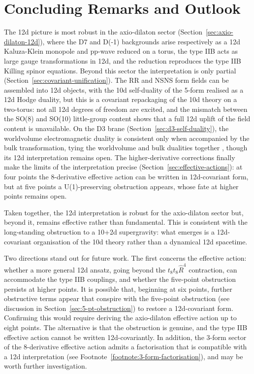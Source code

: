 \section{Concluding Remarks and Outlook}
\label{sec:outlook}

The 12d picture is most robust in the axio-dilaton sector (Section~\ref{sec:axio-dilaton-12d}), where the D7 and D(-1) backgrounds arise respectively as a 12d Kaluza-Klein monopole and pp-wave reduced on a torus, the type IIB \SLZ{} acts as large gauge transformations in 12d, and the reduction reproduces the type IIB Killing spinor equations.
Beyond this sector the interpretation is only partial (Section~\ref{sec:covariant-unification}).
The RR and NSNS form fields can be assembled into 12d objects, with the 10d self-duality of the 5-form realised as a 12d Hodge duality, but this is a covariant repackaging of the 10d theory on a two-torus: not all 12d degrees of freedom are excited, and the mismatch between the SO(8) and SO(10) little-group content shows that a full 12d uplift of the field content is unavailable.
On the D3 brane (Section~\ref{sec:d3-self-duality}), the worldvolume electromagnetic \SLZ{} duality is consistent only when accompanied by the bulk \SLZ{} transformation, tying the worldvolume and bulk dualities together \cite{Tseytlin:1996it}, though its 12d interpretation remains open.
The higher-derivative corrections finally make the limits of the interpretation precise (Section~\ref{sec:effective-actions}): at four points the 8-derivative effective action can be written in 12d-covariant form, but at five points a U(1)-preserving obstruction appears, whose fate at higher points remains open.

Taken together, the 12d interpretation is robust for the axio-dilaton sector but, beyond it, remains effective rather than fundamental.
This is consistent with the long-standing obstruction to a 10+2d supergravity: what emerges is a 12d-covariant organisation of the 10d theory rather than a dynamical 12d spacetime.

Two directions stand out for future work.
The first concerns the effective action: whether a more general 12d ansatz, going beyond the $t_8 t_8 \widehat{R}^4$ contraction, can accommodate the type IIB couplings, and whether the five-point obstruction persists at higher points. 
It is possible that, beginning at six points, further obstructive terms appear that conspire with the five-point obstruction (see discussion in Section~\ref{sec:5-pt-obstruction}) to restore a 12d-covariant form.
Confirming this would require deriving the axio-dilaton effective action up to eight points.
The alternative is that the obstruction is genuine, and the type IIB effective action cannot be written 12d-covariantly.
In addition, the 3-form sector of the 8-derivative effective action admits a factorisation that is compatible with a 12d interpretation (see Footnote~\ref{footnote:3-form-factorisation}), and may be worth further investigation.

